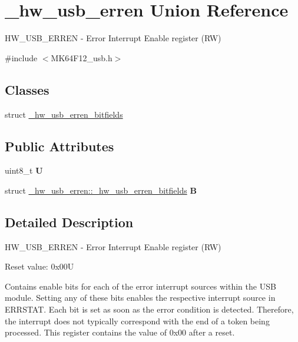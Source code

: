 \hypertarget{union__hw__usb__erren}{}\section{\+\_\+hw\+\_\+usb\+\_\+erren Union Reference}
\label{union__hw__usb__erren}


H\+W\+\_\+\+U\+S\+B\+\_\+\+E\+R\+R\+EN -\/ Error Interrupt Enable register (RW)  




{\ttfamily \#include $<$M\+K64\+F12\+\_\+usb.\+h$>$}

\subsection*{Classes}
\begin{DoxyCompactItemize}
\item 
struct \hyperlink{struct__hw__usb__erren_1_1__hw__usb__erren__bitfields}{\+\_\+hw\+\_\+usb\+\_\+erren\+\_\+bitfields}
\end{DoxyCompactItemize}
\subsection*{Public Attributes}
\begin{DoxyCompactItemize}
\item 
uint8\+\_\+t {\bfseries U}\hypertarget{union__hw__usb__erren_aebaf788c8590a8c69108cbba927d5a19}{}\label{union__hw__usb__erren_aebaf788c8590a8c69108cbba927d5a19}

\item 
struct \hyperlink{struct__hw__usb__erren_1_1__hw__usb__erren__bitfields}{\+\_\+hw\+\_\+usb\+\_\+erren\+::\+\_\+hw\+\_\+usb\+\_\+erren\+\_\+bitfields} {\bfseries B}\hypertarget{union__hw__usb__erren_a87a6b974c69f9d483ad1b8ad03e6a0a6}{}\label{union__hw__usb__erren_a87a6b974c69f9d483ad1b8ad03e6a0a6}

\end{DoxyCompactItemize}


\subsection{Detailed Description}
H\+W\+\_\+\+U\+S\+B\+\_\+\+E\+R\+R\+EN -\/ Error Interrupt Enable register (RW) 

Reset value\+: 0x00U

Contains enable bits for each of the error interrupt sources within the U\+SB module. Setting any of these bits enables the respective interrupt source in E\+R\+R\+S\+T\+AT. Each bit is set as soon as the error condition is detected. Therefore, the interrupt does not typically correspond with the end of a token being processed. This register contains the value of 0x00 after a reset. 

